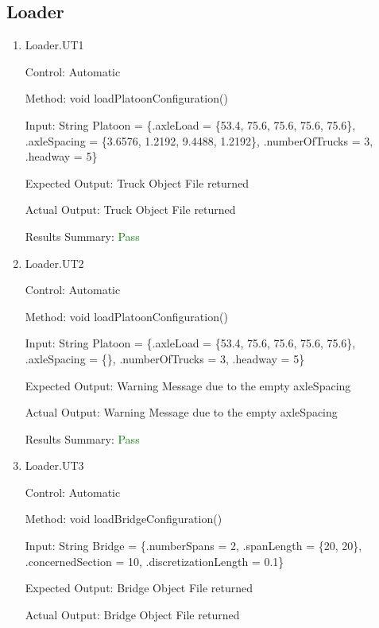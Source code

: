 \documentclass[12pt, titlepage]{article}
\begin{document}
    \subsection{Loader}
\begin{enumerate}
    \item{Loader.UT1\\}
    
    Control: Automatic
    
    Method:  void loadPlatoonConfiguration()
    
    Input: String Platoon = \{.axleLoad = \{53.4, 75.6, 75.6, 75.6, 75.6\},
                        .axleSpacing = \{3.6576, 1.2192, 9.4488, 1.2192\},
                        .numberOfTrucks = 3,
                        .headway = 5\}
    
    Expected Output: Truck Object File returned 

    Actual Output: Truck Object File returned
    
    Results Summary: \textcolor{green} {Pass}

    \item{Loader.UT2\\}
    
    Control: Automatic
    
    Method:  void loadPlatoonConfiguration()
    
    Input: String Platoon = \{.axleLoad = \{53.4, 75.6, 75.6, 75.6, 75.6\},
                        .axleSpacing = \{\},
                        .numberOfTrucks = 3,
                        .headway = 5\}
    
    Expected Output: Warning Message due to the empty axleSpacing

    Actual Output: Warning Message due to the empty axleSpacing

    Results Summary: \textcolor{green} {Pass}

    \item{Loader.UT3\\}
    
    Control: Automatic
    
    Method:  void loadBridgeConfiguration()
    
    Input: String Bridge = \{.numberSpans = 2,
                         .spanLength = \{20, 20\},
                         .concernedSection = 10,
                         .discretizationLength = 0.1\}
    
    Expected Output: Bridge Object File returned 

    Actual Output: Bridge Object File returned 


\end{enumerate}
\end{document}

